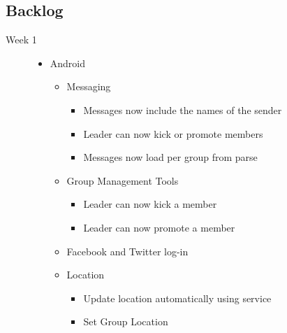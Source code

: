 \subsection{Backlog}
\begin{description}
	\item[Week 1] \hfill
	\begin{itemize}
		\item Android
		\begin{itemize}
			\item Messaging
			\begin{itemize}
				\item Messages now include the names of the sender
				\item Leader can now kick or promote members
				\item Messages now load per group from parse
			\end{itemize}
			\item Group Management Tools
			\begin{itemize}
				\item Leader can now kick a member
				\item Leader can now promote a member
			\end{itemize}
			\item Facebook and Twitter log-in
			\item Location
			\begin{itemize}
				\item Update location automatically using service
				\item Set Group Location
			\end{itemize}
		\end{itemize}
	\end{itemize}
	

\end{description}
